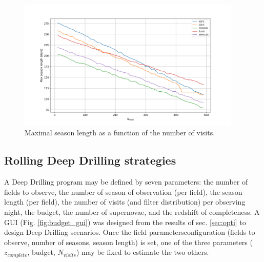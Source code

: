 \documentclass[\docopts]{\docclass}
\newcommand{\zcomp}{\mbox{$z_{complete}$}}
\newcommand{\nvisits}{$N_{visits}$}
\begin{document}
{\begin{figure}[htbp]
\begin{center}
  \includegraphics[width=0.95\textwidth]{seasonlength_nvisits.png}
 \caption{Maximal season length as a function of the number of visits.}\label{fig:seasonlength_nvisits}
\end{center}
\end{figure}

\subsection{Rolling Deep Drilling strategies}
A Deep Drilling program may be defined by seven parameters: the number of fields to observe, the number of season of observation (per field), the season length (per field), the number of visits (and filter distribution) per observing night, the budget, the number of supernovae, and the redshift of completeness. A GUI (Fig. \ref{fig:budget_gui}) was designed from the results of sec. \ref{sec:opti} to design Deep Drilling scenarios. Once the field parametersconfiguration (fields to observe, number of seasons, season length) is set, one of the three parameters (\zcomp, budget, \nvisits) may be fixed to estimate the two others. 

}
\end{document}
